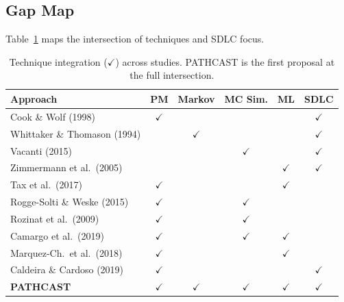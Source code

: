 \subsection{Gap Map}

Table~\ref{tab:gap} maps the intersection of techniques and SDLC focus.

\begin{table}[htbp]
\centering
\caption{Technique integration ($\checkmark$) across studies. PATHCAST is
the first proposal at the full intersection.}
\label{tab:gap}
\small
\begin{tabular}{p{3.8cm}ccccc}
\toprule
\textbf{Approach} & \textbf{PM} & \textbf{Markov} &
\textbf{MC Sim.} & \textbf{ML} & \textbf{SDLC} \\
\midrule
Cook \& Wolf (1998)             & $\checkmark$ &              &              &              & $\checkmark$ \\
Whittaker \& Thomason (1994)    &              & $\checkmark$ &              &              & $\checkmark$ \\
Vacanti (2015)                  &              &              & $\checkmark$ &              & $\checkmark$ \\
Zimmermann et al.\ (2005)        &              &              &              & $\checkmark$ & $\checkmark$ \\
Tax et al.\ (2017)               & $\checkmark$ &              &              & $\checkmark$ &              \\
Rogge-Solti \& Weske (2015)     & $\checkmark$ &              & $\checkmark$ &              &              \\
Rozinat et al.\ (2009)           & $\checkmark$ &              & $\checkmark$ &              &              \\
Camargo et al.\ (2019)          & $\checkmark$ &              & $\checkmark$ & $\checkmark$ &              \\
Marquez-Ch.\ et al.\ (2018)       & $\checkmark$ &              &              & $\checkmark$ &              \\
Caldeira \& Cardoso (2019)     & $\checkmark$ &              &              &              & $\checkmark$ \\
\midrule
\textbf{PATHCAST} & $\boldsymbol{\checkmark}$ & $\boldsymbol{\checkmark}$ &
$\boldsymbol{\checkmark}$ & $\boldsymbol{\checkmark}$ & $\boldsymbol{\checkmark}$ \\
\bottomrule
\end{tabular}
\end{table}

